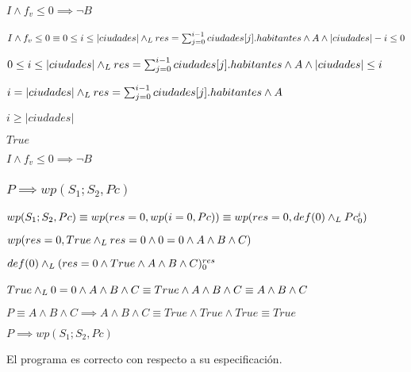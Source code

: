 \documentclass[10pt,a4paper]{article}
\begin{document}
\paragraph{$I \wedge f_{v} \leq 0 \implies \neg B$}
$I \wedge f_{v} \leq 0 \equiv 0 \leq i \leq |ciudades| \land _L res = \sum_{j=0}^{i-1} ciudades[j].habitantes \wedge A \wedge |ciudades| - i \leq 0$ \equiv \par
\begin{center}
    $0 \leq i \leq |ciudades| \land _L res = \sum_{j=0}^{i-1} ciudades[j].habitantes \wedge A \wedge |ciudades| \leq i$ \equiv \par
    \vspace{5px}
    $i = |ciudades| \land _L res = \sum_{j=0}^{i-1} ciudades[j].habitantes \wedge A $ \implies \par
    \vspace{5px}
    $i \geq |ciudades|$ \equiv \par
    \vspace{5px}
    $True$ \par
    \vspace{5px}
    $I \wedge f_{v} \leq 0 \implies \neg B$
\end{center}

\subsubsection{$P \implies wp(S_{1};S_{2}, Pc)$}
$wp(S_{1};S_{2}, Pc) \equiv wp(res = 0, wp(i = 0, Pc)) \equiv wp(res = 0, def(0) \land _L Pc_{0}^{i})$ \equiv \par
\vspace{5px}
$wp(res = 0, True \land _L res = 0 \wedge 0 = 0 \wedge A \wedge B \wedge C) $ \equiv \par
\vspace{5px}
$def(0) \land _L (res = 0 \wedge True \wedge A \wedge B \wedge C)_{0}^{res} $ \equiv \par
\vspace{5px}
$True \land _L 0 = 0 \wedge A \wedge B \wedge C \equiv True \wedge A \wedge B \wedge C \equiv  A \wedge B \wedge C $ \ \par
\vspace{20px}
$P \equiv A \wedge B \wedge C \implies A \wedge B \wedge C \equiv True \wedge True \wedge True \equiv True$ \par
\vspace{5px}
\begin{center}
    $P \implies wp(S_{1};S_{2}, Pc)$
\end{center}
El programa es correcto con respecto a su especificación.
\end{document}
